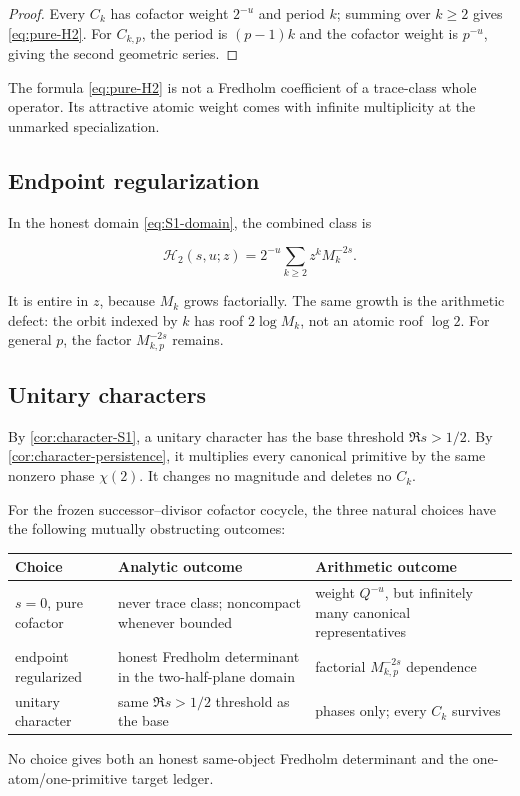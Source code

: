 \begin{proof}
Every \(C_k\) has cofactor weight \(2^{-u}\) and period \(k\); summing over
\(k\ge2\) gives \cref{eq:pure-H2}.  For \(C_{k,p}\), the period is
\((p-1)k\) and the cofactor weight is \(p^{-u}\), giving the second geometric
series.
\end{proof}

The formula \cref{eq:pure-H2} is not a Fredholm coefficient of a trace-class
whole operator.  Its attractive atomic weight comes with infinite
multiplicity at the unmarked specialization.

\subsection{Endpoint regularization}

In the honest domain \cref{eq:S1-domain}, the combined class is

\begin{equation}
 \mathcal H_2(s,u;z)=
 2^{-u}\sum_{k\ge2}z^kM_k^{-2s}.
\label{eq:regularized-H2}
\end{equation}

It is entire in \(z\), because \(M_k\) grows factorially.  The same growth is
the arithmetic defect: the orbit indexed by \(k\) has roof
\(2\log M_k\), not an atomic roof \(\log2\).  For general \(p\), the
factor \(M_{k,p}^{-2s}\) remains.

\subsection{Unitary characters}

By \cref{cor:character-S1}, a unitary character has the base threshold
\(\Re s>1/2\).  By \cref{cor:character-persistence}, it multiplies every
canonical primitive by the same nonzero phase \(\chi(2)\).  It changes no
magnitude and deletes no \(C_k\).

\begin{theorem}
\label{thm:trilemma}
For the frozen successor--divisor cofactor cocycle, the three natural choices
have the following mutually obstructing outcomes:

\begin{center}
\small
\begin{tabularx}{0.96\textwidth}{L{0.24\textwidth}L{0.30\textwidth}Y}
\toprule
Choice & Analytic outcome & Arithmetic outcome \\
\midrule
\(s=0\), pure cofactor
& never trace class; noncompact whenever bounded
& weight \(Q^{-u}\), but infinitely many canonical representatives \\
endpoint regularized
& honest Fredholm determinant in the two-half-plane domain
& factorial \(M_{k,p}^{-2s}\) dependence \\
unitary character
& same \(\Re s>1/2\) threshold as the base
& phases only; every \(C_k\) survives \\
\bottomrule
\end{tabularx}
\end{center}

No choice gives both an honest same-object Fredholm determinant and the
one-atom/one-primitive target ledger.
\end{theorem}

